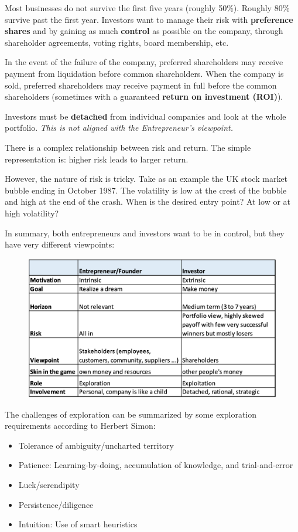 \documentclass[a4paper]{extarticle}
\begin{document}
Most businesses do not survive the first five years (roughly 50\%). Roughly 80\% survive past the first year. Investors want to manage their risk with \textbf{preference shares} and by gaining as much \textbf{control} as possible on the company, through shareholder agreements, voting rights, board membership, etc.

In the event of the failure of the company, preferred shareholders may receive payment from liquidation before common shareholders. When the company is sold, preferred shareholders may receive payment in full before the common shareholders (sometimes with a guaranteed \textbf{return on investment (ROI)}).

Investors must be \textbf{detached} from individual companies and look at the whole portfolio. \textit{This is not aligned with the Entrepreneur's viewpoint.}

There is a complex relationship between risk and return. The simple representation is: higher risk leads to larger return.

However, the nature of risk is tricky. Take as an example the UK stock market bubble ending in October 1987. The volatility is low at the crest of the bubble and high at the end of the crash. When is the desired entry point? At low or at high volatility?

In summary, both entrepreneurs and investors want to be in control, but they have very different viewpoints:

\begin{figure}[H]
    \includegraphics[width=13cm]{../images/EnpRisk_Fig2-1}
    \centering
\end{figure}

The challenges of exploration can be summarized by some exploration requirements according to Herbert Simon:

\begin{itemize}
    \item Tolerance of ambiguity/uncharted territory
    \item Patience: Learning-by-doing, accumulation of knowledge, and trial-and-error
    \item Luck/serendipity
    \item Persistence/diligence
    \item Intuition: Use of smart heuristics
\end{itemize}
\end{document}
